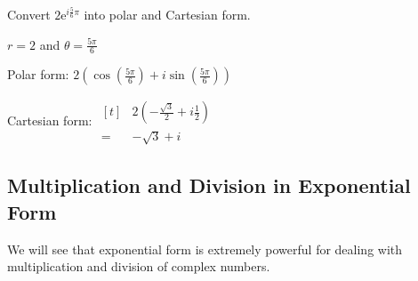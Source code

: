 \documentclass[11pt,a4paper]{book}
\begin{document}
\begin{example}
Convert ${\displaystyle 2\mathrm{e}^{i\frac{5}{6}\pi}}$ into polar and Cartesian
form.

\medskip{}

\Solution

$r=2$ and ${\displaystyle \theta=\frac{5\pi}{6}}$

Polar form: ${\displaystyle 2\left(\cos\left(\frac{5\pi}{6}\right)+i\sin\left(\frac{5\pi}{6}\right)\right)}$

\medskip{}

Cartesian form:
$
\begin{aligned}[t]
 & 2\left(-\frac{\sqrt{3}}{2}+i\frac{1}{2}\right)\\
= & -\sqrt{3}+i
\end{aligned}
$

\end{example}

\newpage


\subsection{Multiplication and Division in Exponential Form}

We will see that exponential form is extremely powerful for dealing
with multiplication and division of complex numbers.
\end{document}
